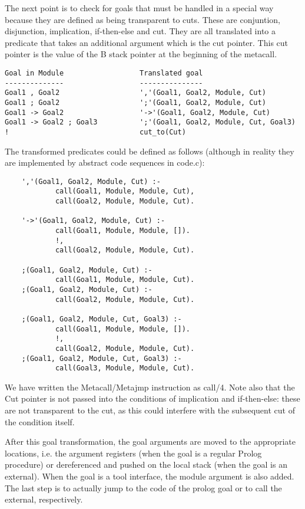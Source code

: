 The next point is to check for goals that must be handled in a special
way because they are defined as being transparent to cuts.
These are conjuntion, disjunction, implication, if-then-else and cut.
They are all translated into a predicate that takes an additional
argument which is the cut pointer. This cut pointer is the value of the
B stack pointer at the beginning of the metacall.
\begin{verbatim}
Goal in Module                  Translated goal
--------------                  ---------------
Goal1 , Goal2                   ','(Goal1, Goal2, Module, Cut)
Goal1 ; Goal2                   ';'(Goal1, Goal2, Module, Cut)
Goal1 -> Goal2                  '->'(Goal1, Goal2, Module, Cut)
Goal1 -> Goal2 ; Goal3          ';'(Goal1, Goal2, Module, Cut, Goal3)
!                               cut_to(Cut)
\end{verbatim}
The transformed predicates could be defined as follows (although
in reality they are implemented by abstract code sequences in code.c):
\begin{verbatim}
    ','(Goal1, Goal2, Module, Cut) :-
            call(Goal1, Module, Module, Cut),
            call(Goal2, Module, Module, Cut).

    '->'(Goal1, Goal2, Module, Cut) :-
            call(Goal1, Module, Module, []).
            !,
            call(Goal2, Module, Module, Cut).

    ;(Goal1, Goal2, Module, Cut) :-
            call(Goal1, Module, Module, Cut).
    ;(Goal1, Goal2, Module, Cut) :-
            call(Goal2, Module, Module, Cut).

    ;(Goal1, Goal2, Module, Cut, Goal3) :-
            call(Goal1, Module, Module, []).
            !,
            call(Goal2, Module, Module, Cut).
    ;(Goal1, Goal2, Module, Cut, Goal3) :-
            call(Goal3, Module, Module, Cut).
\end{verbatim}
We have written the Metacall/Metajmp instruction as call/4.
Note also that the Cut pointer is not passed into the conditions
of implication and if-then-else: these are not transparent to the
cut, as this could interfere with the subsequent cut of the condition
itself.

After this goal transformation, the goal arguments are moved to the
appropriate locations, i.e. the argument registers (when the goal is a
regular Prolog procedure) or dereferenced and pushed on the local
stack (when the goal is an external).  When the goal is a tool
interface, the module argument is also added.  The last step is to
actually jump to the code of the prolog goal or to call the external,
respectively.


